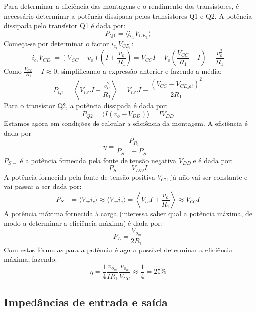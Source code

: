 \documentclass[%
  reprint,
  nofootinbib,
  amsmath,amssymb,
  aps,
  10pt,
  a4paper
]{revtex4-1}
\begin{document}
Para determinar a eficiência das montagens e o rendimento dos transístores, é necessário determinar a potência dissipada pelos transistores Q1 e Q2.
A potência dissipada pelo transístor Q1 é dada por:
\begin{equation}
P_{Q1}=\langle i_{c_1} V_{{CE}_1}\rangle
\end{equation}
Começa-se por determinar o factor $i_{c_1} V_{{CE}_1}$:
\begin{equation}
i_{c_1} V_{{CE}_1}=(V_{CC}-v_o)\left(I+\frac{v_o}{R_1}\right)=V_{CC}I+V_o\left(\frac{V_{CC}}{R_1}-I\right)-\frac{v_o^2}{R_1}
\end{equation}
Como $\frac{V_{CC}}{R_1}-I\approx0$, simplificando a expressão anterior e fazendo a média:
\begin{equation}
P_{Q1}=\left\langle V_{CC}I-\frac{v_o^2}{R_1} \right\rangle=V_{CC}I-\frac{(V_{CC}-V_{{CE}_sat})^2}{2R_1}
\end{equation}
Para o transístor Q2, a potência dissipada é dada por:
\begin{equation}
P_{Q2}=\langle I(v_o-V_{DD}) \rangle=IV_{DD}
\end{equation}
Estamos agora em condições de calcular a eficiência da montagem. A eficiência é dada por:
\begin{equation}
\eta=\frac{P_{R_1}}{P_{S+}+P_{S-}}
\end{equation}
$P_{S-}$ é a potência fornecida pela fonte de tensão negativa $V_{DD}$ e é dada por:
\begin{equation}
P_{S-}=V_{DD}I
\end{equation}
A potência fornecida pela fonte de tensão positiva $V_{CC}$ já não vai ser constante e vai passar a ser dada por:
\begin{equation}
P_{S+}=\langle V_{cc} i_c \rangle \approx \langle V_{cc} i_e \rangle =\left\langle V_{cc} I+\frac{v_o}{R_1} \right\rangle \approx V_{CC}I
\end{equation}
A potência máxima fornecida à carga (interessa saber qual a potência máxima, de modo a determinar a eficiência máxima) é dada por:
\begin{equation}
P_{L}=\frac{V_{o_m}}{2R_1}
\end{equation}
Com estas fórmulas para a potência é agora possível determinar a eficiência máxima, fazendo:
\begin{equation}
\eta=\frac{1}{4}\frac{v_{o_m}}{IR_1}\frac{v_{o_m}}{V_{CC}}\approx\frac{1}{4}=25\%
\end{equation}

\subsection{Impedâncias de entrada e saída}
\end{document}
